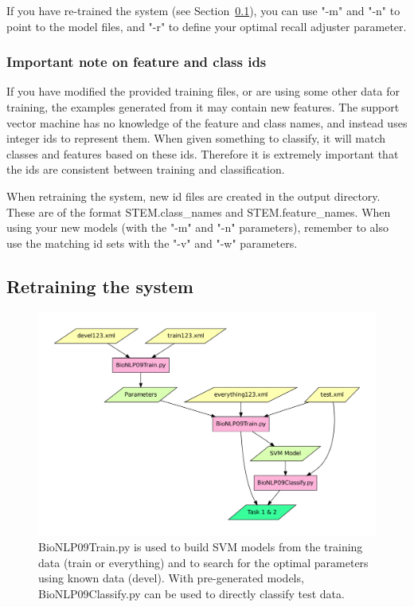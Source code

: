 \documentclass[a4paper,12pt]{article}
\begin{document}
If you have re-trained the system (see Section~\ref{sec-retraining}), you can
use "-m" and "-n" to point to the model files, and "-r" to define your optimal 
recall adjuster parameter.

\subsubsection{Important note on feature and class ids}

If you have modified the provided training files, or are using some other data
for training, the examples generated from it may contain new features. The
support vector machine has no knowledge of the feature and class names, and
instead uses integer ids to represent them. When given something to classify, it
will match classes and features based on these ids. Therefore it is extremely
important that the ids are consistent between training and classification.

When retraining the system, new id files are created in the output directory.
These are of the format STEM.class\_names and STEM.feature\_names. When using
your new models (with the "-m" and "-n" parameters), remember to also use the
matching id sets with the "-v" and "-w" parameters.

\subsection{Retraining the system}
\label{sec-retraining}

\begin{figure}[h]
\begin{center}
\includegraphics[scale=0.5]{Figures/programs12.pdf}
\end{center}
\caption{BioNLP09Train.py is used to build SVM models from the training data
(train or everything) and to search for the optimal parameters using known data
(devel). With pre-generated models, BioNLP09Classify.py can be used to directly
classify test data. }
\label{fig-programs12}
\end{figure}
\end{document}
